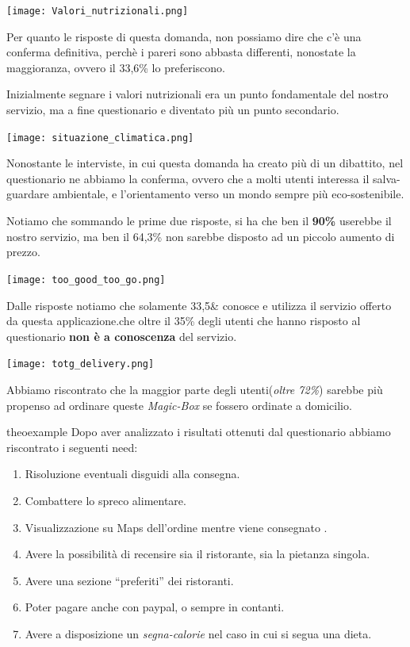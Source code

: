 \documentclass{article}
\begin{document}
    \par \vspace{1cm}
\texttt{[image: Valori\_nutrizionali.png]}\par
Per quanto le risposte di questa domanda, non possiamo dire che c'è una conferma definitiva, perchè i pareri sono abbasta differenti, nonostate la maggioranza, ovvero il 33,6\% lo preferiscono. \par
Inizialmente segnare i valori nutrizionali era un punto fondamentale del nostro servizio, ma a fine questionario e diventato più un punto secondario.\par \vspace{1cm}
\texttt{[image: situazione\_climatica.png]}\par
Nonostante le interviste, in cui questa domanda ha creato più di un dibattito, nel questionario ne abbiamo la conferma, ovvero che a molti utenti interessa il salva-guardare ambientale, e l'orientamento verso un mondo sempre più eco-sostenibile.\par Notiamo che sommando le prime due risposte, si ha che ben il \textbf{90\%} userebbe il nostro servizio, ma ben il 64,3\% non sarebbe disposto ad un piccolo aumento di prezzo. \par \vspace{1cm}
\texttt{[image: too\_good\_too\_go.png]}\par
Dalle risposte notiamo che solamente 33,5\& conosce e utilizza il servizio offerto da questa applicazione.\parVediamo che oltre il 35\% degli utenti che hanno risposto al questionario \textbf{non è a conoscenza} del servizio.\par \vspace{1cm}
\texttt{[image: totg\_delivery.png]} \par
Abbiamo riscontrato che la maggior parte degli utenti(\textit{oltre 72\%}) sarebbe più propenso ad ordinare queste \textit{Magic-Box} se fossero ordinate a domicilio.
\begin{need}{}{theoexample}
    Dopo aver analizzato i risultati ottenuti dal questionario abbiamo riscontrato i seguenti need:
    \begin{enumerate}
        \item Risoluzione eventuali disguidi alla consegna.
        \item Combattere lo spreco alimentare.
        \item Visualizzazione su Maps dell'ordine mentre viene consegnato .
        \item Avere la possibilità di recensire sia il ristorante, sia la pietanza singola.
        \item Avere una sezione “preferiti” dei ristoranti.
        \item Poter pagare anche con paypal, o sempre in contanti.
        \item Avere a disposizione un \textit{segna-calorie} nel caso in cui si segua una dieta.
    \end{enumerate}
    \end{need}
\end{document}
